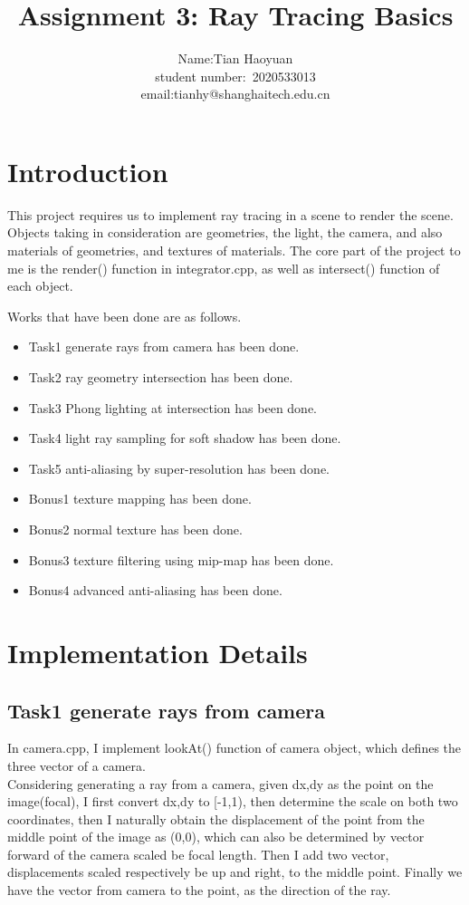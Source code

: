 \documentclass[acmtog]{acmart}
\title{Assignment 3: {Ray Tracing Basics}}
\author{Name:\quad Tian Haoyuan  \\ student number:\  2020533013
\\email:\quad tianhy@shanghaitech.edu.cn}
\begin{document}
\maketitle

\vspace*{2 ex}

\section{Introduction}
This project requires us to implement ray tracing in a scene to render the scene. Objects taking in consideration are geometries, the light, the camera, and also materials of geometries, and textures of materials. The core part of the project to me is the render() function in integrator.cpp, as well as intersect() function of each object.

Works that have been done are as follows.
\begin{itemize}
	\item Task1 generate rays from camera has been done.
	\item Task2 ray geometry intersection has been done.
	\item Task3 Phong lighting at intersection has been done.
	\item Task4 light ray sampling for soft shadow has been done.
	\item Task5 anti-aliasing by super-resolution has been done.
	\item Bonus1 texture mapping has been done.
	\item Bonus2 normal texture has been done.
	\item Bonus3 texture filtering using mip-map has been done.
	\item Bonus4 advanced anti-aliasing has been done.
\end{itemize}

\section{Implementation Details}
\subsection{Task1 generate rays from camera}
In camera.cpp, I implement lookAt() function of camera object, which defines the three vector of a camera.\\
Considering generating a ray from a camera, given dx,dy as the point on the image(focal), I first convert dx,dy to [-1,1), then determine the scale on both two coordinates, then I naturally obtain the displacement of the point from the middle point of the image as (0,0), which can also be determined by vector forward of the camera scaled be focal length.
Then I add two vector, displacements scaled respectively be up and right, to the middle point. Finally we have the vector from camera to the point, as the direction of the ray.
\end{document}
